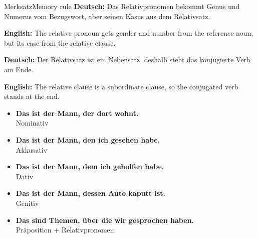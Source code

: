 \documentclass[a4paper,11pt]{article}
\newcommand{\GermanText}[1]{\textbf{Deutsch: }#1\par}
\newcommand{\EnglishText}[1]{{\small\color{SoftGray}\textbf{English: }#1\par}}
\newcommand{\ExampleItem}[2]{\item \textbf{#1}\\{\small\color{SoftGray}#2}}
\begin{document}
        \begin{grammarentry}{Merksatz}{Memory rule}
            \GermanText{Das Relativpronomen bekommt Genus und Numerus vom Bezugswort, aber seinen Kasus aus dem Relativsatz.}
            \EnglishText{The relative pronoun gets gender and number from the reference noun, but its case from the relative clause.}
            
            \GermanText{Der Relativsatz ist ein Nebensatz, deshalb steht das konjugierte Verb am Ende.}
            \EnglishText{The relative clause is a subordinate clause, so the conjugated verb stands at the end.}
            
            \begin{exbox}
                \begin{itemize}
                    \ExampleItem{Das ist der Mann, der dort wohnt.}{Nominativ}
                    \ExampleItem{Das ist der Mann, den ich gesehen habe.}{Akkusativ}
                    \ExampleItem{Das ist der Mann, dem ich geholfen habe.}{Dativ}
                    \ExampleItem{Das ist der Mann, dessen Auto kaputt ist.}{Genitiv}
                    \ExampleItem{Das sind Themen, über die wir gesprochen haben.}{Präposition + Relativpronomen}
                \end{itemize}
            \end{exbox}
        \end{grammarentry}
\end{document}
